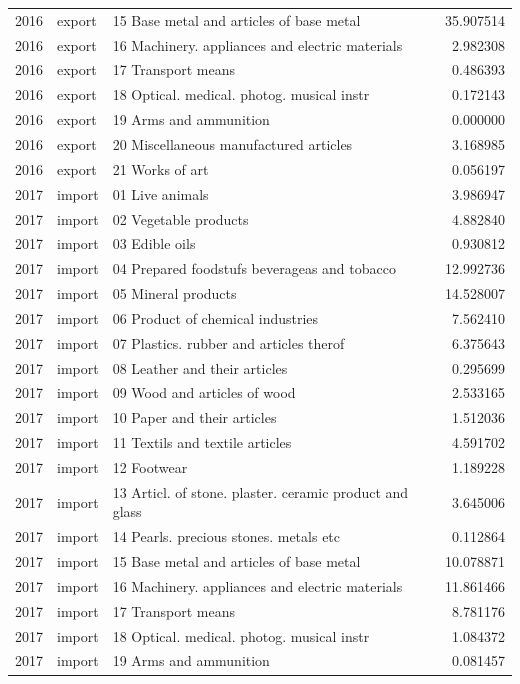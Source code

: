 \begin{tabular}{rllr}
2016 & export & 15 Base metal and articles of base metal & 35.907514 \\
2016 & export & 16 Machinery. appliances and electric materials & 2.982308 \\
2016 & export & 17 Transport means & 0.486393 \\
2016 & export & 18 Optical. medical. photog. musical instr & 0.172143 \\
2016 & export & 19 Arms and ammunition & 0.000000 \\
2016 & export & 20 Miscellaneous manufactured articles & 3.168985 \\
2016 & export & 21 Works of art & 0.056197 \\
2017 & import & 01 Live animals & 3.986947 \\
2017 & import & 02 Vegetable products & 4.882840 \\
2017 & import & 03 Edible oils & 0.930812 \\
2017 & import & 04 Prepared foodstufs beverageas and tobacco & 12.992736 \\
2017 & import & 05 Mineral products & 14.528007 \\
2017 & import & 06 Product of chemical industries & 7.562410 \\
2017 & import & 07 Plastics. rubber and articles therof & 6.375643 \\
2017 & import & 08 Leather and their articles & 0.295699 \\
2017 & import & 09 Wood and articles of wood & 2.533165 \\
2017 & import & 10 Paper and their articles & 1.512036 \\
2017 & import & 11 Textils and textile articles & 4.591702 \\
2017 & import & 12 Footwear & 1.189228 \\
2017 & import & 13 Articl. of stone. plaster. ceramic product and glass & 3.645006 \\
2017 & import & 14 Pearls. precious stones. metals etc & 0.112864 \\
2017 & import & 15 Base metal and articles of base metal & 10.078871 \\
2017 & import & 16 Machinery. appliances and electric materials & 11.861466 \\
2017 & import & 17 Transport means & 8.781176 \\
2017 & import & 18 Optical. medical. photog. musical instr & 1.084372 \\
2017 & import & 19 Arms and ammunition & 0.081457 \\

\end{tabular}
